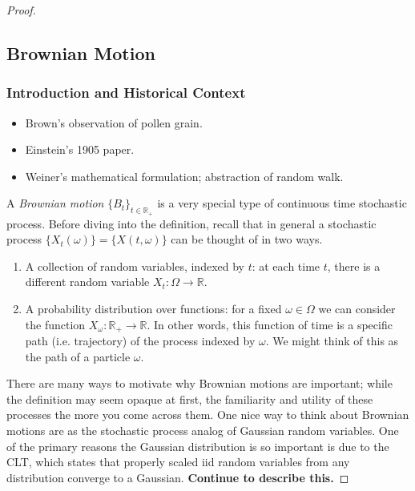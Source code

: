 \documentclass[12pt]{article}
\newcommand{\R}{\mathbb{R}}
\begin{document}
\begin{proof}
\subsection{Brownian Motion}

\subsubsection{Introduction and Historical Context}
\begin{itemize}
\item Brown's observation of pollen grain. 
\item Einstein's 1905 paper. 
\item Weiner's mathematical formulation; abstraction of random walk. 
\end{itemize}



A \textit{Brownian motion} $\{B_t\}_{t \in \R_+}$ is a very special type of continuous time stochastic process. Before diving into the definition, recall that in general a stochastic process 
$\{X_t(\omega)\} = \{X(t, \omega)\}$ can be thought of in two ways. 
\begin{enumerate}
\item A collection of random variables, indexed by $t$: at each time $t$, there is a different random variable $X_t: \Omega \to \R$. 
\item A probability distribution over functions: for a fixed $\omega \in \Omega$ we can consider the function $X_\omega: \R_+ \to \R$. In other words, this function of time is 
a specific path (i.e. trajectory) of the process indexed by $\omega$. We might think of this as the path of a particle $\omega$. 
\end{enumerate}

There are many ways to motivate why Brownian motions are important; while the definition may seem opaque at first, the familiarity and utility of these processes the more you come across them. 
One nice way to think about Brownian motions are as the stochastic process analog of Gaussian random variables. One of the primary reasons the Gaussian distribution is so important is due to 
the CLT, which states that properly scaled iid random variables from any distribution converge to a Gaussian. \textbf{Continue to describe this.}





\end{proof}
\end{document}
